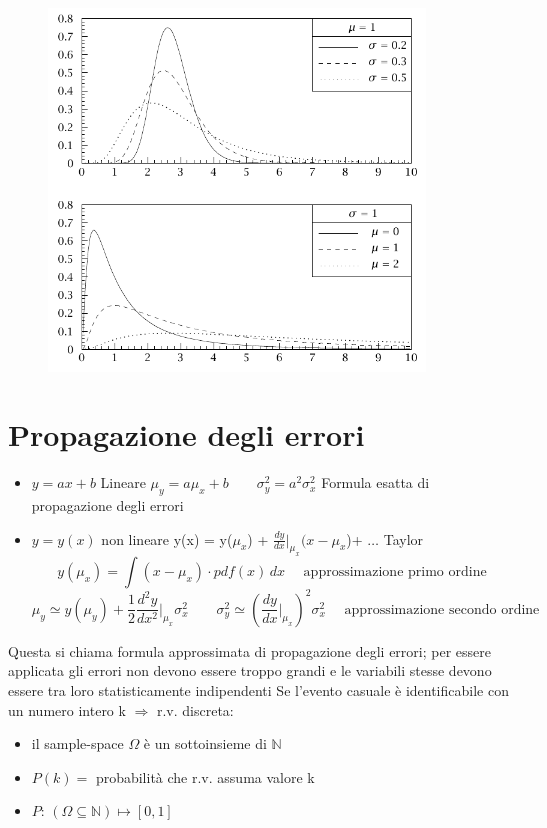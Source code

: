 \documentclass[12pt]{report}
\theoremstyle{remark}
\theoremstyle{theorem}
\begin{document}
\begin{figure}[H]
    \centering
    \includegraphics[width=10cm]{immagini/log-normale.png}
    \label{fig:log-normale}
\end{figure}

\section{Propagazione degli errori}

\begin{itemize}
	\item $y = ax +b$ \; Lineare \quad $\mu_y = a\mu_x +b \qquad \sigma^2_y = a^2\sigma^2_x$ \; Formula esatta di propagazione degli errori 
	\item $y=y(x)$ \; non lineare \qquad y(x) = y($\mu_x$) + $\frac{dy}{dx}\Big|_{\mu_x}(x-\mu_x$)+ $\dots$ \; Taylor 
	\[y(\mu_x) = \int (x-\mu_x)\cdot pdf(x) \, dx \quad\text{ approssimazione primo ordine}\]
	\[\mu_y \simeq y(\mu_y)+\frac{1}{2} \frac{d^2y}{dx^2}\Big|_{\mu_x}\sigma^2_x \qquad \sigma^2_y \simeq {\left(\frac{dy}{dx}\Big|_{\mu_x}\right)}^2\sigma^2_x \quad \text{ approssimazione secondo ordine}\]
\end{itemize}
Questa si chiama formula approssimata di propagazione degli errori; per essere applicata gli errori non devono essere troppo grandi e le variabili stesse devono essere tra loro statisticamente indipendenti \newline
Se l'evento casuale è identificabile con un numero intero k $\Rightarrow$ r.v. discreta:

\begin{itemize}
	\item il sample-space $\Omega$ è un sottoinsieme di $\mathbb{N}$
	\item $P(k) =$ probabilità che r.v. assuma valore k
	\item $P:\, (\Omega \subseteq \mathbb{N}) \mapsto [0,1]$
\end{itemize}
\end{document}
